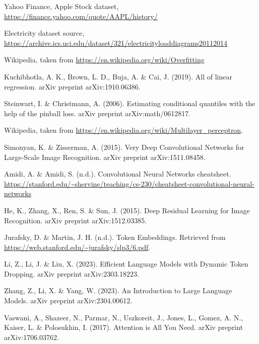 
\begin{thebibliography}{99}


	 Yahoo Finance, Apple Stock dataset, \url{https://finance.yahoo.com/quote/AAPL/history/}

	 Electricity dataset source, \url{https://archive.ics.uci.edu/dataset/321/electricityloaddiagrams20112014}

	 Wikipedia, taken from \url{https://en.wikipedia.org/wiki/Overfitting}

	 Kuchibhotla, A. K., Brown, L. D., Buja, A. \& Cai, J. (2019). All of linear regression. arXiv preprint arXiv:1910.06386.

	 Steinwart, I. \& Christmann, A. (2006). Estimating conditional quantiles with the help of the pinball loss. arXiv preprint arXiv:math/0612817.

	 Wikipedia, taken from \url{https://en.wikipedia.org/wiki/Multilayer_perceptron}.

	 Simonyan, K. \& Zisserman, A. (2015). Very Deep Convolutional Networks for Large-Scale Image Recognition. arXiv preprint arXiv:1511.08458.

	 Amidi, A. \& Amidi, S. (n.d.). Convolutional Neural Networks cheatsheet. \url{https://stanford.edu/~shervine/teaching/cs-230/cheatsheet-convolutional-neural-networks}

	 He, K., Zhang, X., Ren, S. \& Sun, J. (2015). Deep Residual Learning for Image Recognition. arXiv preprint arXiv:1512.03385.

	 Jurafsky, D. \& Martin, J. H. (n.d.). Token Embeddings. Retrieved from \url{https://web.stanford.edu/~jurafsky/slp3/6.pdf}.

	 Li, Z., Li, J. \& Liu, X. (2023). Efficient Language Models with Dynamic Token Dropping. arXiv preprint arXiv:2303.18223.

	 Zhang, Z., Li, X. \& Yang, W. (2023). An Introduction to Large Language Models. arXiv preprint arXiv:2304.00612.

	 Vaswani, A., Shazeer, N., Parmar, N., Uszkoreit, J., Jones, L., Gomez, A. N., Kaiser, L. \& Polosukhin, I. (2017). Attention is All You Need. arXiv preprint arXiv:1706.03762.


\end{thebibliography}
